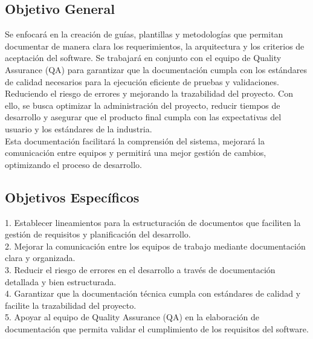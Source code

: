 \documentclass[12pt,letterpaper,spanish, xcolor=table]{report}
\begin{document}
\subsection{Objetivo General}

	Se enfocará en la creación de guías, plantillas y metodologías que permitan documentar de manera clara los requerimientos, la arquitectura y los criterios de aceptación del software. Se trabajará en conjunto con el equipo de Quality Assurance (QA) para garantizar que la documentación cumpla con los estándares de calidad necesarios para la ejecución eficiente de pruebas y validaciones.\\
	
	Reduciendo el riesgo de errores y mejorando la trazabilidad del proyecto. Con ello, se busca optimizar la administración del proyecto, reducir tiempos de desarrollo y asegurar que el producto final cumpla con las expectativas del usuario y los estándares de la industria.\\
	
	Esta documentación facilitará la comprensión del sistema, mejorará la comunicación entre equipos y permitirá una mejor gestión de cambios, optimizando el proceso de desarrollo.
	


\subsection{Objetivos Específicos}

	1. Establecer lineamientos para la estructuración de documentos que faciliten la gestión de requisitos y planificación del desarrollo.\\
	
	2. Mejorar la comunicación entre los equipos de trabajo mediante documentación clara y organizada.\\
	
	3. Reducir el riesgo de errores en el desarrollo a través de documentación detallada y bien estructurada.\\
	
	4. Garantizar que la documentación técnica cumpla con estándares de calidad y facilite la trazabilidad del proyecto.\\
	
	5. Apoyar al equipo de Quality Assurance (QA) en la elaboración de documentación que permita validar el cumplimiento de los requisitos del software.\\
\end{document}
